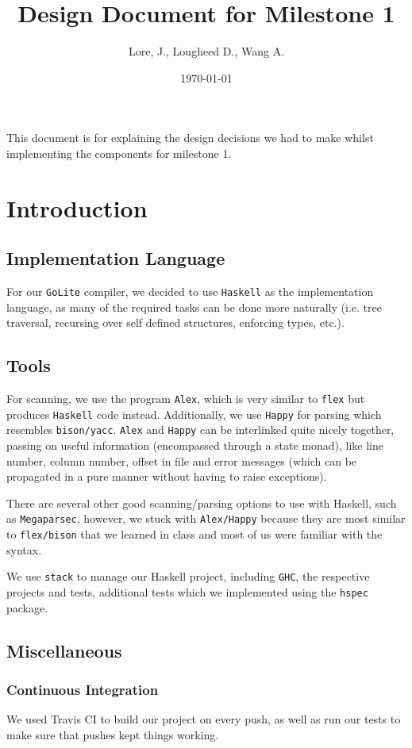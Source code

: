 \documentclass[11pt]{article}
\author{Lore, J., Lougheed D., Wang A.}
\date{\today}
\title{Design Document for Milestone 1}
\begin{document}
\maketitle
\tableofcontents

This document is for explaining the design decisions we had to make
whilst implementing the components for milestone 1.
\section{Introduction}
\label{sec:orgc165de5}
\subsection{Implementation Language}
\label{sec:org2007130}
For our \texttt{GoLite} compiler, we decided to use \texttt{Haskell} as the
implementation language, as many of the required tasks can be done
more naturally (i.e. tree traversal, recursing over self defined
structures, enforcing types, etc.).
\subsection{Tools}
\label{sec:orge14a0c9}
For scanning, we use the program \texttt{Alex}, which is very similar to \texttt{flex}
but produces \texttt{Haskell} code instead. Additionally, we use \texttt{Happy} for
parsing which resembles \texttt{bison/yacc}. \texttt{Alex} and \texttt{Happy} can be interlinked
quite nicely together, passing on useful information (encompassed
through a state monad), like line number, column number, offset in
file and error messages (which can be propagated in a pure manner
without having to raise exceptions).

There are several other good scanning/parsing options to use with
Haskell, such as \texttt{Megaparsec}, however, we stuck with \texttt{Alex/Happy} because
they are most similar to \texttt{flex/bison} that we learned in class and most
of us were familiar with the syntax.

We use \texttt{stack} to manage our Haskell project, including \texttt{GHC}, the
respective projects and tests, additional tests which we implemented
using the \texttt{hspec} package.
\subsection{Miscellaneous}
\label{sec:org4c3026d}
\subsubsection{Continuous Integration}
\label{sec:orgc9bb068}
We used Travis CI to build our project on every push, as well as
run our tests to make sure that pushes kept things working.
\end{document}
